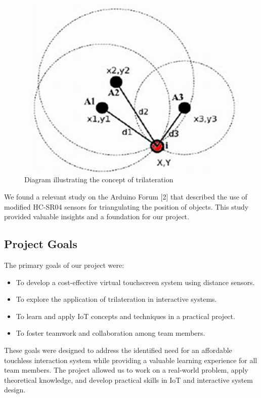 \documentclass[12pt,a4paper]{article}
\begin{document}
\begin{figure}[!htp]
    \centering
    \includegraphics[scale=0.3]{../IoT Materials/article images/1-Trilateriation-diagram.png}
    \caption{Diagram illustrating the concept of trilateration}
\end{figure}

We found a relevant study on the Arduino Forum [2] that described the use of modified HC-SR04 sensors for triangulating the position of objects. This study provided valuable insights and a foundation for our project.

\subsection{Project Goals}
The primary goals of our project were:
\begin{itemize}
    \item To develop a cost-effective virtual touchscreen system using distance sensors.
    \item To explore the application of trilateration in interactive systems.
    \item To learn and apply IoT concepts and techniques in a practical project.
    \item To foster teamwork and collaboration among team members.
\end{itemize}

These goals were designed to address the identified need for an affordable touchless interaction system while providing a valuable learning experience for all team members. The project allowed us to work on a real-world problem, apply theoretical knowledge, and develop practical skills in IoT and interactive system design.
\end{document}
